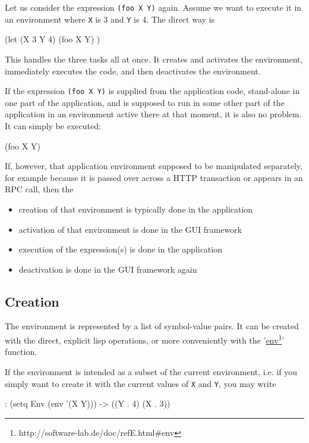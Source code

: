 Let us consider the expression \texttt{(foo X Y)} again. Assume we want to execute it
in an environment where \texttt{X} is 3 and \texttt{Y} is 4. The direct way is
\begin{wideverbatim}
   (let (X 3 Y 4)
      (foo X Y) )
\end{wideverbatim}

This handles the three tasks all at once. It creates and activates the
environment, immediately executes the code, and then deactivates the
environment.

If the expression \texttt{(foo X Y)} is supplied from the application code,
stand-alone in one part of the application, and is supposed to run in some other
part of the application in an environment active there at that moment, it is
also no problem. It can simply be executed:
\begin{wideverbatim}
   (foo X Y)
\end{wideverbatim}

If, however, that application environment supposed to be manipulated
separately, for example because it is passed over across a HTTP transaction or
appears in an RPC call, then the
\begin{itemize}
   \item creation of that environment is typically done in the application
   \item activation of that environment is done in the GUI framework
   \item execution of the expression(s) is done in the application
   \item deactivation is done in the GUI framework again
\end{itemize}

\subsection{Creation}
\label{sec:firstclass-creation}

The environment is represented by a list of symbol-value pairs. It can be
created with the direct, explicit lisp operations, or more conveniently with the
'\underline{env}\footnote{http://software-lab.de/doc/refE.html\#env}' function.

If the environment is intended as a subset of the current environment, i.e. if
you simply want to create it with the current values of \texttt{X} and \texttt{Y}, you may
write
\begin{wideverbatim}
   : (setq Env (env '(X Y)))
   -> ((Y . 4) (X . 3))
\end{wideverbatim}

